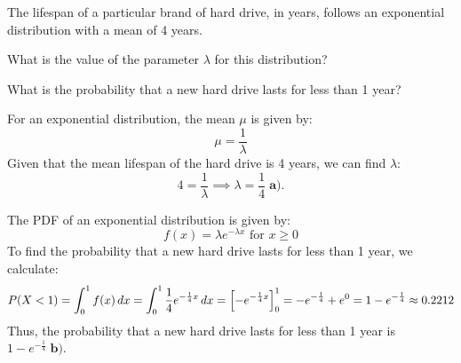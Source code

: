 \documentclass[a4paper, 10pt]{article}
\begin{document}
\begin{problem}
The lifespan of a particular brand of hard drive, in years, follows an exponential
distribution with a mean of 4 years.
\begin{subproblems}
    \item What is the value of the parameter \( \lambda \) for this distribution?
    \item What is the probability that a new hard drive lasts for less than 1 year?
\end{subproblems}
\end{problem}

\begin{solution}
For an exponential distribution, the mean \( \mu \) is given by:
\[ \mu = \frac{1}{\lambda} \]
Given that the mean lifespan of the hard drive is 4 years, we can find \( \lambda \):
\[ 4 = \frac{1}{\lambda} \implies \lambda = \boxed{\frac{1}{4}} \; \textbf{a).} \]

The PDF of an exponential distribution is given by:
\[ f(x) = \lambda e^{-\lambda x} \text{ for } x \geq 0 \]
To find the probability that a new hard drive lasts for less than 1 year, we calculate:
\[ P(X < 1) = \int_{0}^{1} f(x)\,dx = \int_{0}^{1} \frac{1}{4} e^{-\frac{1}{4} x}\,dx = \left[-e^{-\frac{1}{4} x}\right]_{0}^{1} = -e^{-\frac{1}{4}} + e^{0} = 1 - e^{-\frac{1}{4}} \approx 0.2212 \]
Thus, the probability that a new hard drive lasts for less than 1 year is \( \boxed{1 - e^{-\frac{1}{4}}} \; \textbf{b).} \)
\end{solution}
\end{document}
